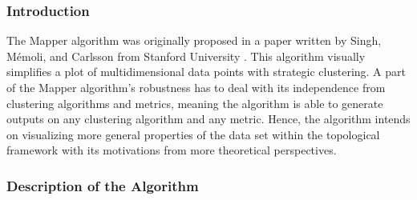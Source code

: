 \documentclass[12pt]{article}
\theoremstyle{definition}
\begin{document}
\subsubsection{Introduction}
The Mapper algorithm was originally proposed in a paper written by Singh, M\'emoli, and Carlsson from Stanford University \cite{originalmapper}. This algorithm visually simplifies a plot of multidimensional data points with strategic clustering. A part of the Mapper algorithm's robustness has to deal with its independence from clustering algorithms and metrics, meaning the algorithm is able to generate outputs on any clustering algorithm and any metric. Hence, the algorithm intends on visualizing more general properties of the data set within the topological framework with its motivations from more theoretical perspectives.

\subsubsection{Description of the Algorithm}
\end{document}
